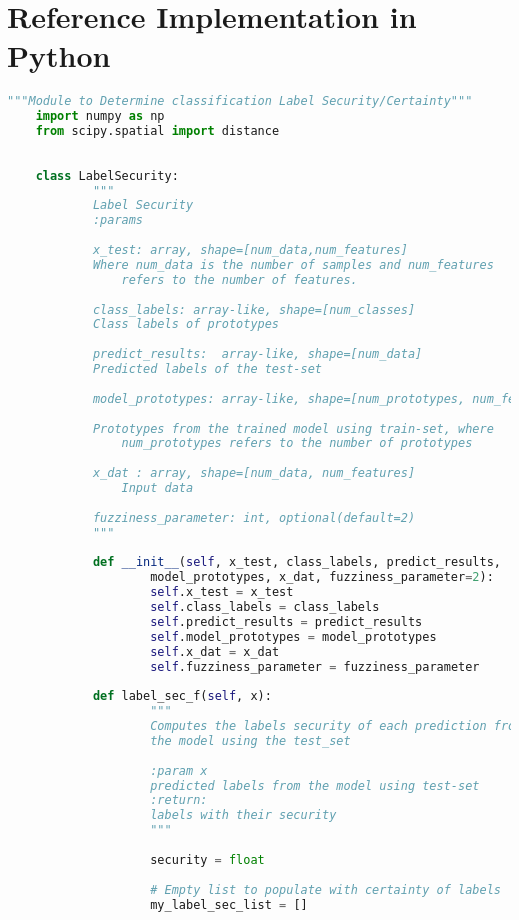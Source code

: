 \documentclass[english]{HSMW-Thesis}
\begin{document}
\Anhang

\chapter{Reference Implementation in Python}
\begin{lstlisting}[caption=label\textunderscore security1.py ,style=chstyle, language=Python]
	"""Module to Determine classification Label Security/Certainty"""
	import numpy as np
	from scipy.spatial import distance
	
	
	class LabelSecurity:
			"""
			Label Security
			:params
	
			x_test: array, shape=[num_data,num_features]
			Where num_data is the number of samples and num_features
		 		refers to the number of features.
		 
			class_labels: array-like, shape=[num_classes]
			Class labels of prototypes
	
			predict_results:  array-like, shape=[num_data]
			Predicted labels of the test-set
	
			model_prototypes: array-like, shape=[num_prototypes, num_features]
	
			Prototypes from the trained model using train-set, where
		 		num_prototypes refers to the number of prototypes
	
			x_dat : array, shape=[num_data, num_features]
				Input data
	
			fuzziness_parameter: int, optional(default=2)
			"""
	
			def __init__(self, x_test, class_labels, predict_results,
		 			model_prototypes, x_dat, fuzziness_parameter=2):
					self.x_test = x_test
					self.class_labels = class_labels
					self.predict_results = predict_results
					self.model_prototypes = model_prototypes
					self.x_dat = x_dat
					self.fuzziness_parameter = fuzziness_parameter
	
			def label_sec_f(self, x):
					"""
					Computes the labels security of each prediction from
					the model using the test_set
	
					:param x
					predicted labels from the model using test-set
					:return:
					labels with their security
					"""
	
					security = float
			
					# Empty list to populate with certainty of labels
					my_label_sec_list = []
	

\end{lstlisting}
\end{document}
